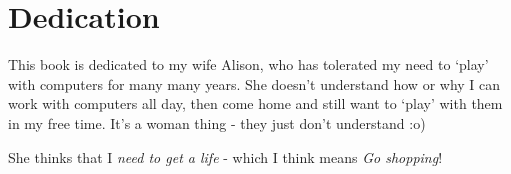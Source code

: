 \section*{Dedication}\label{dedication}

This book is dedicated to my wife Alison, who has tolerated my need to
`play' with computers for many many years. She doesn't understand how or
why I can work with computers all day, then come home and still want to
`play' with them in my free time. It's a woman thing - they just don't
understand :o)

She thinks that I \emph{need to get a life} - which I think means
\emph{Go shopping}!

